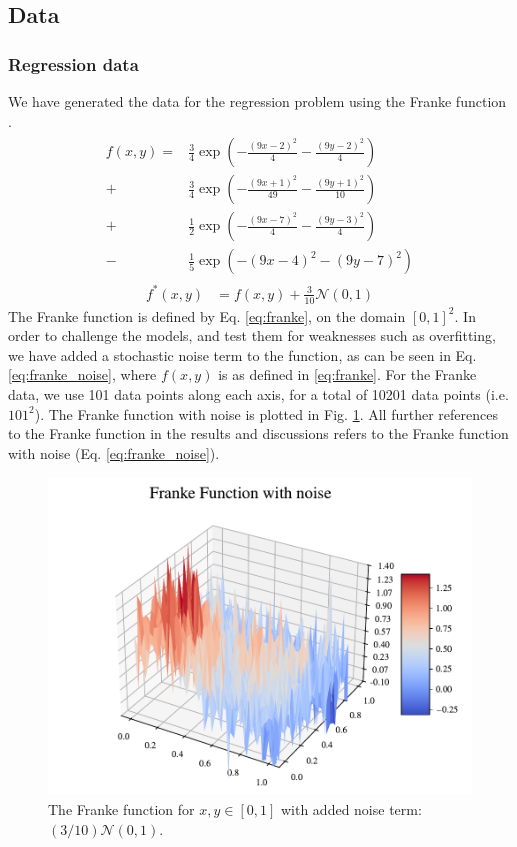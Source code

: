 \subsection{Data}
\subsubsection{Regression data}
We have generated the data for the regression problem using the Franke function \citep[p. 13]{frank}.
\begin{align}
\begin{split}\label{eq:franke}
    f(x, y) = &\frac{3}{4} \exp\left( -\frac{(9x - 2)^2}{4} - \frac{(9y - 2)^2}{4} \right) \\
    + &\frac{3}{4} \exp\left( -\frac{(9x + 1)^2}{49} - \frac{(9y + 1)^2}{10} \right)  \\
    + &\frac{1}{2} \exp\left( -\frac{(9x - 7)^2}{4} - \frac{(9y - 3)^2}{4} \right)  \\
    - &\frac{1}{5} \exp\left( -(9x - 4)^2 - (9y - 7)^2 \right)
\end{split}
\end{align}
\begin{align}\label{eq:franke_noise}
    f^*(x,y) &= f(x, y) + \frac{3}{10} \mathcal{N}(0, 1)
\end{align}
The Franke function is defined by Eq. \ref{eq:franke}, on the domain $[0, 1]^2$. 
In order to challenge the models, and test them for weaknesses such as overfitting, we have added a stochastic noise term to the function, as can be seen in Eq. \ref{eq:franke_noise}, where $f(x,y)$ is as defined in \ref{eq:franke}.
For the Franke data, we use 101 data points along each axis, for a total of 10201 data points (i.e. $101^2$).
The Franke function with noise is plotted in Fig. \ref{fig:franke_noise}.
All further references to the Franke function in the results and discussions refers to the Franke function with noise (Eq. \ref{eq:franke_noise}).

\begin{figure}[h!]
\centering
\includegraphics[width=1\linewidth]{project_1/figures/figures_in_report/franke_func_noise.pdf}
\caption{The Franke function for $x,y \in [0,1]$ with added noise term: $(3/10) \mathcal{N}(0, 1)$.}
\label{fig:franke_noise}
\end{figure}

